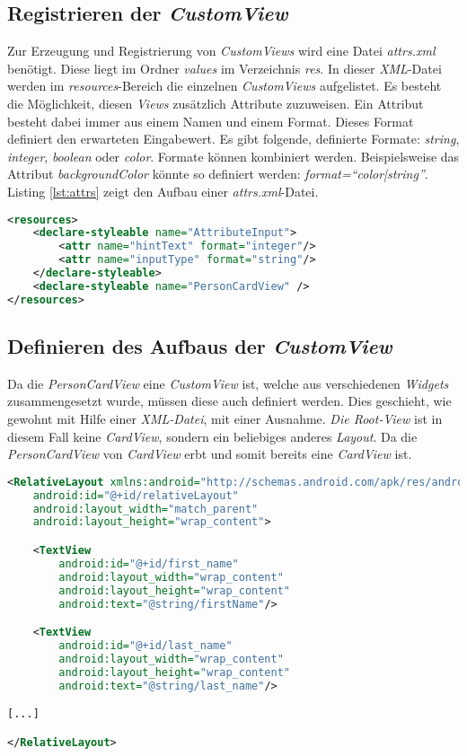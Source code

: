 \subsection{Registrieren der \textit{CustomView}}
Zur Erzeugung und Registrierung von \textit{CustomViews} wird eine Datei \textit{attrs.xml} benötigt. Diese liegt im Ordner \textit{values} im Verzeichnis \textit{res}. 
In dieser \textit{XML}-Datei werden im \textit{resources}-Bereich die einzelnen \textit{CustomViews} aufgelistet. Es besteht die Möglichkeit, diesen \textit{Views} zusätzlich Attribute zuzuweisen. Ein Attribut besteht dabei immer aus einem Namen und einem Format. Dieses Format definiert den erwarteten Eingabewert. Es gibt folgende, definierte Formate: \textit{string}, \textit{integer}, \textit{boolean} oder \textit{color}. 
Formate können kombiniert werden. Beispielsweise das Attribut \textit{backgroundColor} könnte so definiert werden: \textit{format=\enquote{color|string}}. Listing \ref{lst:attrs} zeigt den Aufbau einer \textit{attrs.xml}-Datei.

\begin{lstlisting}[label=lst:attrs,
language=xml,
firstnumber=1,
caption=Aufbau einer \textit{attrs.xml} - Datei.]				  
<resources>
	<declare-styleable name="AttributeInput">
		<attr name="hintText" format="integer"/>
		<attr name="inputType" format="string"/>
	</declare-styleable>
	<declare-styleable name="PersonCardView" />
</resources>
\end{lstlisting}

\subsection{Definieren des Aufbaus der \textit{CustomView}}

Da die \textit{PersonCardView} eine \textit{CustomView} ist, welche aus verschiedenen \textit{Widgets} zusammengesetzt wurde, müssen diese auch definiert werden. Dies geschieht, wie gewohnt mit Hilfe einer \textit{XML-Datei}, mit einer Ausnahme. \textit{Die Root-View} ist in diesem Fall keine \textit{CardView}, sondern ein beliebiges anderes \textit{Layout}. Da die \textit{PersonCardView} von \textit{CardView} erbt und somit bereits eine \textit{CardView} ist.

\begin{lstlisting}[label=lst:personCardViewXml,
language=xml,
firstnumber=1,
caption=Aufbau der \textit{PersonCardView} mit Hilfe einer \textit{XML}-Datei]				  
<RelativeLayout xmlns:android="http://schemas.android.com/apk/res/android"
	android:id="@+id/relativeLayout"
	android:layout_width="match_parent"
	android:layout_height="wrap_content">

	<TextView
		android:id="@+id/first_name"
		android:layout_width="wrap_content"
		android:layout_height="wrap_content"
		android:text="@string/firstName"/>

	<TextView
		android:id="@+id/last_name"
		android:layout_width="wrap_content"
		android:layout_height="wrap_content"
		android:text="@string/last_name"/>

[...]

</RelativeLayout>
\end{lstlisting}


